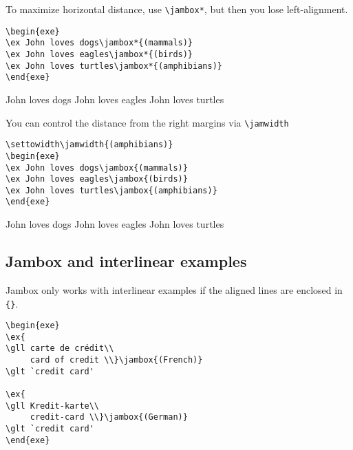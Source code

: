 \documentclass[output=guidelines]{langscibook}
\newcommand{\cmd}[1]{\texttt{\textbackslash#1}}
\begin{document}
To maximize horizontal distance, use \cmd{jambox*}, but then you lose left-alignment.

\begin{lstlisting} 
\begin{exe}
\ex John loves dogs\jambox*{(mammals)}
\ex John loves eagles\jambox*{(birds)}
\ex John loves turtles\jambox*{(amphibians)}   
\end{exe}
 \end{lstlisting}
 
\begin{exe}
\settowidth{}
\ex John loves dogs
\ex John loves eagles
\ex John loves turtles   
\end{exe}  


You can control the distance from the right margins via \cmd{jamwidth}

\begin{lstlisting}
\settowidth\jamwidth{(amphibians)}
\begin{exe}
\ex John loves dogs\jambox{(mammals)}
\ex John loves eagles\jambox{(birds)}
\ex John loves turtles\jambox{(amphibians)}   
\end{exe}
 \end{lstlisting}
 
\begin{exe}
\settowidth{}
\ex John loves dogs
\ex John loves eagles
\ex John loves turtles   
\end{exe}  


\subsection{Jambox and interlinear examples} 
Jambox only works with interlinear examples if the aligned lines are enclosed in \texttt{\{\}}. 

\begin{lstlisting}
\begin{exe} 
\ex{
\gll carte de crédit\\
     card of credit \\}\jambox{(French)}
\glt `credit card'

\ex{
\gll Kredit-karte\\
     credit-card \\}\jambox{(German)}
\glt `credit card'
\end{exe} 
 \end{lstlisting}
 
\end{document}
